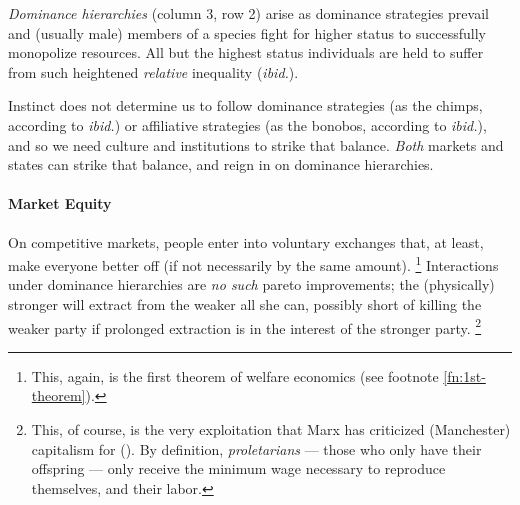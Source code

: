 

\emph{Dominance hierarchies} (column 3, row 2) arise as dominance strategies prevail and (usually male) members of a species fight for higher status to successfully monopolize resources.
 All but the highest status individuals are held to suffer from such heightened \emph{relative} inequality (\emph{ibid.}).

Instinct does not determine us to follow dominance strategies (as the chimps, according to \emph{ibid.}) or affiliative strategies (as the bonobos, according to \emph{ibid.}), and so we need culture and institutions to strike that balance.
\emph{Both} markets and states can strike that balance, and reign in on dominance hierarchies.

\paragraph{Market Equity}  \label{sec:market-equity} On competitive markets, people enter into voluntary exchanges that, at least, make everyone better off (if not necessarily by the same amount).
\footnote{
	This, again, is the first theorem of welfare economics (see footnote \ref{fn:1st-theorem}).
}
Interactions under dominance hierarchies are \emph{no such} pareto improvements;
the (physically) stronger will extract from the weaker all she can, possibly short of killing the weaker party if prolonged extraction is in the interest of the stronger party.
\footnote{
	This, of course, is the very exploitation that Marx has criticized (Manchester) capitalism for (\citeyear{MarxEngels-1848-aa,Marx-1867-aa}).
	By definition, \emph{proletarians} --- those who only have their offspring --- only receive the minimum wage necessary to reproduce themselves, and their labor.
}

